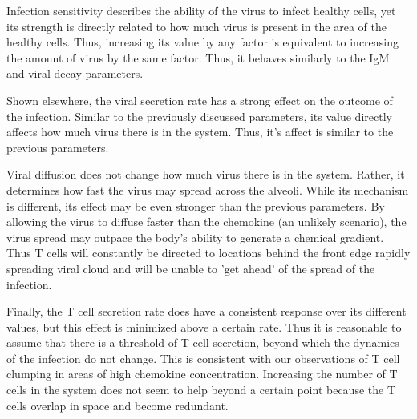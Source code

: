 \documentclass[10pt]{article}
\newcommand{\removed}[1]{{\color{dkred}\sout{#1}}}
\newcommand{\drew}[1]{{\color{dkgreen}#1}}
\newcommand{\fred}[1]{{\color{dkblue}#1}}
\begin{document}
Infection sensitivity describes the ability of the virus to infect healthy cells, yet its strength is directly related to how much virus is present in the area of the healthy cells.  Thus, increasing its value by any factor is equivalent to increasing the amount of virus by the same factor.  Thus, it behaves similarly to the IgM and viral decay parameters.

Shown elsewhere, the viral secretion rate has a strong effect on the outcome of the infection.  Similar to the previously discussed parameters, its value directly affects how much virus there is in the system.  Thus, it's affect is similar to the previous parameters.

Viral diffusion does not change how much virus there is in the system.  Rather, it determines how fast the virus may spread across the alveoli.  While its mechanism is different, its effect may be even stronger than the previous parameters.  By allowing the virus to diffuse faster than the chemokine (an unlikely scenario), the virus spread may outpace the body's ability to generate a chemical gradient.  Thus T cells will constantly be directed to locations behind the front edge rapidly spreading viral cloud and will be unable to 'get ahead' of the spread of the infection.

Finally, the T cell secretion rate does have a consistent response over its different values, but this effect is minimized above a certain rate.  Thus it is reasonable to assume that there is a threshold of T cell secretion, beyond which the dynamics of the infection do not change.  This is consistent with our observations of T cell clumping in areas of high chemokine concentration.  Increasing the number of T cells in the system does not seem to help beyond a certain point because the T cells overlap in space and become redundant.


%
\end{document}
